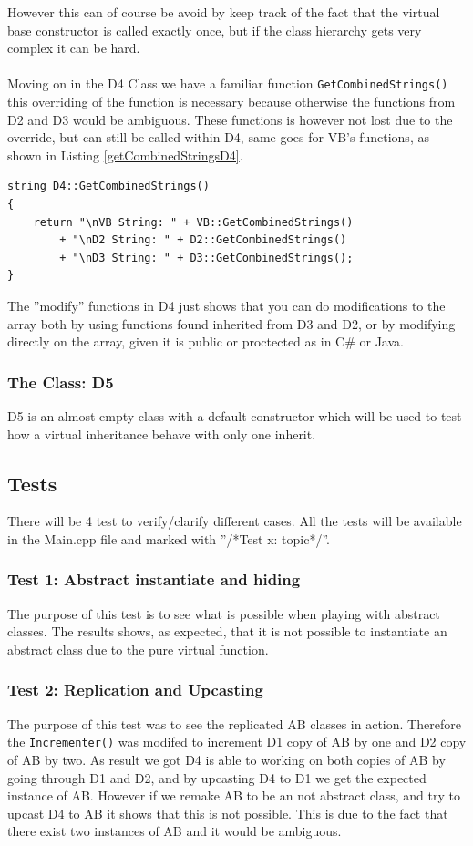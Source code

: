However this can of course be avoid by keep track of the fact that the virtual base constructor is called exactly once, but if the class hierarchy gets very complex it can be hard.\\\\
Moving on in the D4 Class we have a familiar function \lstinline$GetCombinedStrings()$ this overriding of the function is necessary because otherwise the functions from D2 and D3 would be ambiguous.
These functions is however not lost due to the override, but can still be called within D4, same goes for VB's functions, as shown in Listing \ref{getCombinedStringsD4}.
\begin{lstlisting}[caption=Code snippet from D4.cpp line 52, label=getCombinedStringsD4]
string D4::GetCombinedStrings()
{
	return "\nVB String: " + VB::GetCombinedStrings()
		+ "\nD2 String: " + D2::GetCombinedStrings() 
		+ "\nD3 String: " + D3::GetCombinedStrings();
}
\end{lstlisting}
The ''modify'' functions in D4 just shows that you can do modifications to the array both by using functions found inherited from D3 and D2, or by modifying directly on the array, given it is public or proctected as in C\# or Java.

\subsubsection{The Class: D5}\label{D5}
D5 is an almost empty class with a default constructor which will be used to test how a virtual inheritance behave with only one inherit.

\subsection{Tests}
There will be 4 test to verify/clarify different cases.
All the tests will be available in the Main.cpp file and marked with ''/*Test x: topic*/''.
\subsubsection{Test 1: Abstract instantiate and hiding}
The purpose of this test is to see what is possible when playing with abstract classes.
The results shows, as expected, that it is not possible to instantiate an abstract class due to the pure virtual function.

\subsubsection{Test 2: Replication and Upcasting}
The purpose of this test was to see the replicated AB classes in action.
Therefore the \lstinline$Incrementer()$ was modifed to increment D1 copy of AB by one and D2 copy of AB by two.
As result we got D4 is able to working on both copies of AB by going through D1 and D2, and by upcasting D4 to D1 we get the expected instance of AB.
However if we remake AB to be an not abstract class, and try to upcast D4 to AB it shows that this is not possible. 
This is due to the fact that there exist two instances of AB and it would be ambiguous.

